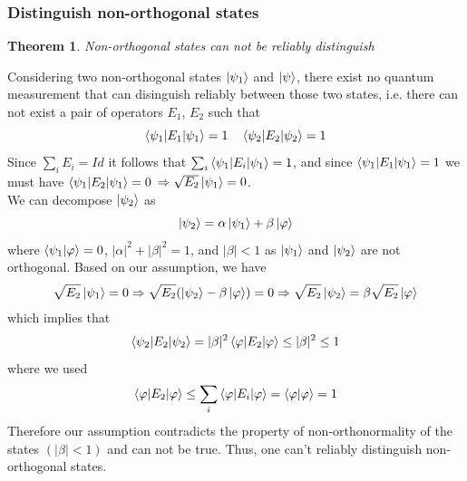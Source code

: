 \documentclass{article}
\newtheorem{theorem}{Theorem}
\begin{document}
\subsubsection*{Distinguish non-orthogonal states}
\begin{theorem}
    Non-orthogonal states can not be reliably distinguish
\end{theorem}
Considering two non-orthogonal states $\ket{\psi_1}$ and $\ket{\psi}$, there exist no quantum measurement that
can disinguish reliably between those two states, i.e. there can not exist a pair of operators $E_1$, $E_2$
such that
\begin{equation}
    \braket{\psi_1|E_1|\psi_1} = 1 \quad \braket{\psi_2|E_2|\psi_2} = 1
\end{equation}
Since $\sum_iE_i=Id$ it follows that $\sum_i\braket{\psi_1|E_i|\psi_1}=1$, and since
$\braket{\psi_1|E_1|\psi_1} = 1$ we must have $\braket{\psi_1|E_2  |\psi_1} = 0$
$\Rightarrow \sqrt{E_2}\ket{\psi_1}=0$.
\\\noindent
We can decompose $\ket{\psi_2}$ as
\begin{equation}
    \ket{\psi_2} = \alpha\ket{\psi_1}+\beta\ket{\varphi}
\end{equation}
where $\braket{\psi_1|\varphi}=0$, $|\alpha|^2 +|\beta|^2 = 1$, and $|\beta|<1$ as
$\ket{\psi_1}$ and $\ket{\psi_2}$ are not orthogonal.
Based on our assumption, we have
\begin{equation}
    \begin{aligned}
        \sqrt{E_2}\ket{\psi_1} = 0
        \Rightarrow \sqrt{E_2}(\ket{\psi_2} - \beta\ket{\varphi}) = 0
        \Rightarrow \sqrt{E_2}\ket{\psi_2} = \beta\sqrt{E_2}\ket{\varphi}
    \end{aligned}
\end{equation}
which implies that
\begin{equation}
    \braket{\psi_2|E_2|\psi_2} = |\beta|^2 \braket{\varphi|E_2|\varphi} \leq |\beta|^2 \leq 1
\end{equation}
where we used
\begin{equation}
\braket{\varphi|E_2|\varphi} \leq \sum_i\braket{\varphi|E_i|\varphi} = \braket{\varphi|\varphi} = 1
\end{equation}
Therefore our assumption contradicts the property of non-orthonormality of the states $(|\beta|<1)$
and can not be true. Thus, one can't reliably distinguish non-orthogonal states.
\end{document}
